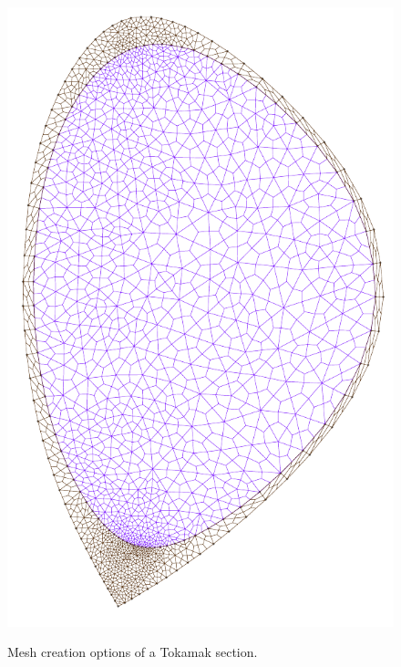 \begin{figure}
{\includegraphics[scale=.55]{images/tokamak_layer_mesh_adapt.pdf}}
\caption{Mesh creation options of a Tokamak section.}\label{fig:mesh}
\end{figure}

